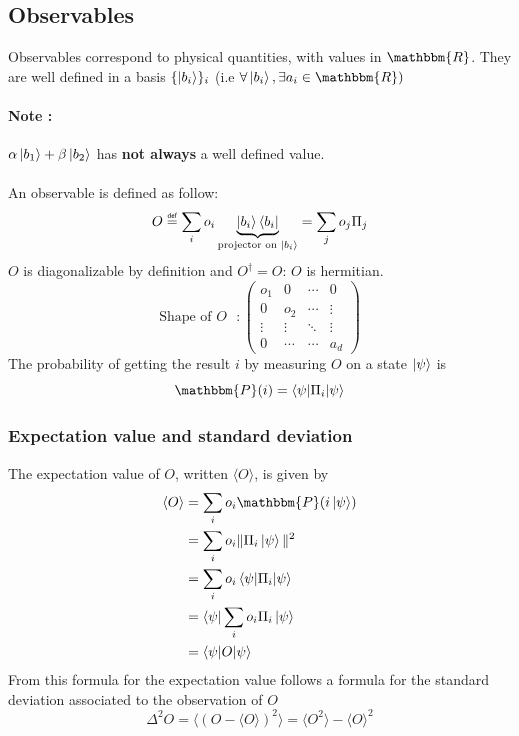 \documentclass{article}
\newcommand\eqdef{\mathrel{\overset{\makebox[0pt]{\mbox{\normalfont\tiny\sffamily
def}}}{=}}}
\begin{document}
\subsection{Observables}
Observables correspond to physical quantities, with values in $\mathbbm{R}$.
They are well defined in a basis $\{\ket{b_i}\}_i$ (i.e $\forall \ket{b_i},
\exists a_i \in \mathbbm{R})$

\paragraph{Note :} $\alpha\ket{b_1} + \beta\ket{b_2}$ has \textbf{not always} a
well defined value. \\
\\
An observable is defined as follow:
\begin{equation}
    O \eqdef \sum_i o_i \underbrace{\ket{b_i}\bra{b_i}}_{\text{projector on $\ket{b_i}$}}
    = \sum_j o_j \Pi_j
\end{equation}
$O$ is diagonalizable by definition and $O^\dagger = O$: $O$ is hermitian.
\begin{equation}
\text{Shape of $O$ } :
\begin{pmatrix}
    o_1 & 0 & \cdots & 0 \\
    0 & o_2 & \cdots & \vdots \\
    \vdots  & \vdots  & \ddots & \vdots  \\
    0 & \cdots & \cdots & a_d
\end{pmatrix}
\end{equation}
The probability of getting the result $i$ by measuring $O$ on a state
$\ket{\psi}$ is
\begin{equation}
\mathbbm{P}(i)=\braket{\psi|\Pi_i|\psi}
\end{equation}
\subsubsection*{Expectation value and standard deviation}
The expectation value of $O$, written $\langle O\rangle$, is given by
\begin{equation}
    \begin{aligned}
        \langle O\rangle
            & = \sum_i o_i \mathbbm{P}(i\ket{\psi}) \\
            & = \sum_i o_i \|\Pi_i\ket{\psi}\|^2 \\
            & = \sum_i o_i \braket{\psi|\Pi_i|\psi} \\
            & = \bra{\psi}\sum_i o_i \Pi_i \ket{\psi} \\
            & = \braket{\psi | O |\psi}
    \end{aligned}
\end{equation}
From this formula for the expectation value follows a formula for the standard
deviation associated to the observation of $O$
\begin{equation}
    \Delta^2 O = \langle(O - \langle O \rangle)^2\rangle = \langle O^2 \rangle - \langle O \rangle^2
\end{equation}
\end{document}
